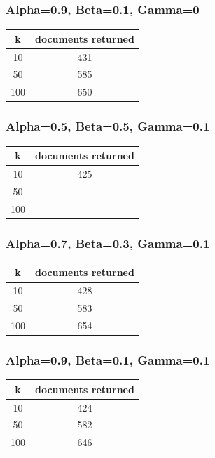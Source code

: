 \documentclass{article}
\begin{document}
\subsubsection{Alpha=0.9, Beta=0.1, Gamma=0}

\begin{center}
\begin{tabular}{|c|c|} \hline
\textbf{k} & \textbf{documents returned} \\ \hline
10 & 431\\
50 & 585\\
100 & 650\\ \hline
\end{tabular}
\end{center}

\subsubsection{Alpha=0.5, Beta=0.5, Gamma=0.1}

\begin{center}
\begin{tabular}{|c|c|} \hline
\textbf{k} & \textbf{documents returned} \\ \hline
10 & 425\\
50 & \\
100 & \\ \hline
\end{tabular}
\end{center}

\subsubsection{Alpha=0.7, Beta=0.3, Gamma=0.1}

\begin{center}
\begin{tabular}{|c|c|} \hline
\textbf{k} & \textbf{documents returned} \\ \hline
10 & 428\\
50 & 583\\
100 & 654\\ \hline
\end{tabular}
\end{center}

\subsubsection{Alpha=0.9, Beta=0.1, Gamma=0.1}

\begin{center}
\begin{tabular}{|c|c|} \hline
\textbf{k} & \textbf{documents returned} \\ \hline
10 & 424\\
50 & 582\\
100 & 646\\ \hline
\end{tabular}
\end{center}
\end{document}

